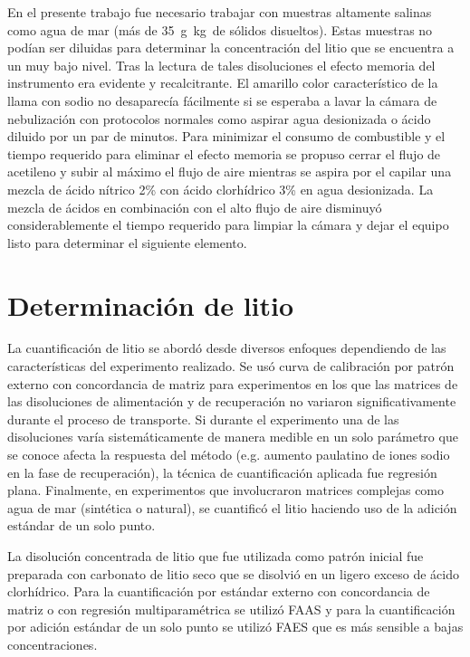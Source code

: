 \vspace{-0.7cm}En el presente trabajo fue necesario trabajar con muestras altamente salinas como agua de mar (más de 35~g~kg\mnn\ de sólidos disueltos). Estas muestras no podían ser diluidas para determinar la concentración del litio que se encuentra a un muy bajo nivel. Tras la lectura de tales disoluciones el efecto memoria del instrumento era evidente y recalcitrante. El amarillo color característico de la llama con sodio no desaparecía fácilmente si se esperaba a lavar la cámara de nebulización con protocolos normales como aspirar agua desionizada o ácido diluido por un par de minutos. Para minimizar el consumo de combustible y el tiempo requerido para eliminar el efecto memoria se propuso cerrar el flujo de acetileno y subir al máximo el flujo de aire mientras se aspira por el capilar una mezcla de ácido nítrico 2\% con ácido clorhídrico 3\% en agua desionizada. La mezcla de ácidos en combinación con el alto flujo de aire disminuyó considerablemente el tiempo requerido para limpiar la cámara y dejar el equipo listo para determinar el siguiente elemento.


\section{Determinación de litio}
La cuantificación de litio se abordó desde diversos enfoques dependiendo de las características del experimento realizado. Se usó curva de calibración por patrón externo con concordancia de matriz para experimentos en los que las matrices de las disoluciones de alimentación y de recuperación no variaron significativamente durante el proceso de transporte. Si durante el experimento una de las disoluciones varía sistemáticamente de manera medible en un solo parámetro que se conoce afecta la respuesta del método (e.g. aumento paulatino de iones sodio en la fase de recuperación), la técnica de cuantificación aplicada fue regresión plana. Finalmente, en experimentos que involucraron matrices complejas como agua de mar (sintética o natural), se cuantificó el litio haciendo uso de la adición estándar de un solo punto.

La disolución concentrada de litio que fue utilizada como patrón inicial fue preparada con carbonato de litio seco que se disolvió en un ligero exceso de ácido clorhídrico. Para la cuantificación por estándar externo con concordancia de matriz o con regresión multiparamétrica se utilizó \ac{FAAS} y para la cuantificación por adición estándar de un solo punto se utilizó \ac{FAES} que es más sensible a bajas concentraciones.

